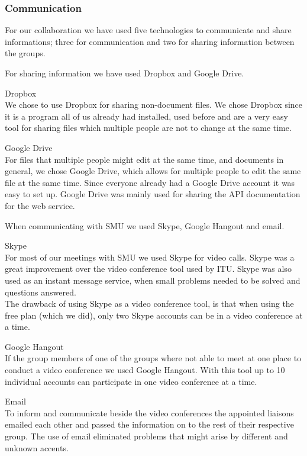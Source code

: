 \subsubsection{Communication}
For our collaboration we have used five technologies to communicate and share informations; three for communication and two for sharing information between the groups.

For sharing information we have used Dropbox and Google Drive. \vspace{-4mm}
\begin{description}
	\item Dropbox \\
		We chose to use Dropbox for sharing non-document files. We chose Dropbox since it is a program all of us already had installed, used before and are a very easy tool for sharing files which multiple people are not to change at the same time.
	\item Google Drive \\
		For files that multiple people might edit at the same time, and documents in general, we chose Google Drive, which allows for multiple people to edit the same file at the same time. Since everyone already had a Google Drive account it was easy to set up.
		Google Drive was mainly used for sharing the API documentation for the web service.
\end{description}

When communicating with SMU we used Skype, Google Hangout and email.
\vspace{-4mm}
\begin{description}
	\item Skype \\
		For most of our meetings with SMU we used Skype for video calls. Skype was a great improvement over the video conference tool used by ITU.
		Skype was also used as an instant message service, when small problems needed to be solved and questions answered. \\
		The drawback of using Skype as a video conference tool, is that when using the free plan (which we did), only two Skype accounts can be in a video conference at a time.
	\item Google Hangout \\
		If the group members of one of the groups where not able to meet at one place to conduct a video conference we used Google Hangout. With this tool up to 10 individual accounts can participate in one video conference at a time.
	\item Email \\
		To inform and communicate beside the video conferences the appointed liaisons emailed each other and passed the information on to the rest of their respective group.
		The use of email eliminated problems that might arise by different and unknown accents.
\end{description}